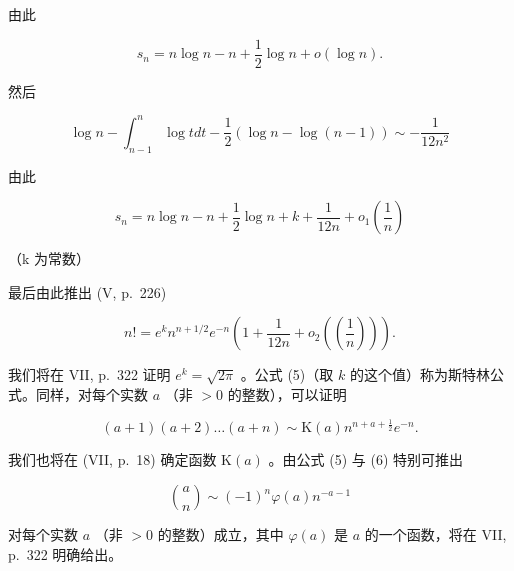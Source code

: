由此

\[
s _ {n} = n \log n - n + \frac {1}{2} \log n + o (\log n).
\]

然后

\[
\log n - \int_ {n - 1} ^ {n} \log t d t - \frac {1}{2} (\log n - \log (n - 1)) \sim - \frac {1}{1 2 n ^ {2}}
\]

由此

\[
s _ {n} = n \log n - n + \frac {1}{2} \log n + k + \frac {1}{1 2 n} + o _ {1} \left(\frac {1}{n}\right)
\]

（k 为常数）

最后由此推出 (V, p.~226)

\[
n! = e ^ {k} n ^ {n + 1 / 2} e ^ {- n} \left(1 + \frac {1}{1 2 n} + o _ {2} \left(\left(\frac {1}{n}\right)\right)\right).\tag{5}
\]

我们将在 VII, p.~322 证明 \(e^k = \sqrt{2\pi}\) 。公式 (5)（取 \(k\) 的这个值）称为斯特林公式。同样，对每个实数 \(a\) （非 \(>0\) 的整数），可以证明

\[
(a + 1) (a + 2) \dots (a + n) \sim \mathrm{K} (a) n ^ {n + a + \frac {1}{2}} e ^ {- n}.\tag{6}
\]

我们也将在 (VII, p.~18) 确定函数 \(\mathrm{K}(a)\) 。由公式 (5) 与 (6) 特别可推出

\[
\binom {a} {n} \sim (- 1) ^ {n}   \varphi (a)   n ^ {- a - 1}\tag{7}
\]

对每个实数 \(a\) （非 \(> 0\) 的整数）成立，其中 \(\varphi(a)\) 是 \(a\) 的一个函数，将在 VII, p.~322 明确给出。

